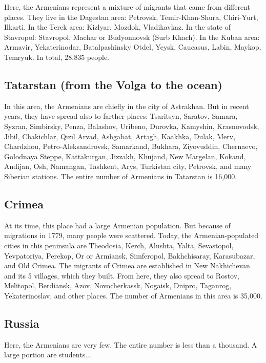 Here, the Armenians represent a mixture of migrants that came from different places. They live in the Dagestan area: Petrovsk, Temir-Khan-Shura, Chiri-Yurt, Ilkarti. In the Terek area: Kizlyar, Mozdok, Vladikavkaz. In the state of Stavropol: Stavropol, Machar or   Budyonnovsk (Surb
Khach). In the Kuban area: Armavir, Yekaterinodar, Batalpashinsky Otdel, Yeysk, Caucasus, Labin, Maykop, Temryuk. In total, 28,835 people. 

\subsection{Tatarstan (from the Volga to the ocean)}

In this area, the Armenians are chiefly in the city of Astrakhan. But in recent years, they have spread also to farther places: Tsaritsyn, Saratov, Samara, Syzran, Simbirsky, Penza, Balashov, Uribeno, Durovka, Kamyshin, Krasnovodsk, Jibil, Chakichlar, Qızıl Arvad, Ashgabat, Artəgh, Kaakhka, Dulak, Merv, Chardzhou, Petro-Aleksandrovsk, Samarkand, Bukhara, Ziyovuddin, Chernaevo, Golodnaya Steppe, Kattakurgan, Jizzakh, Khujand, New Margelan, Kokand, Andijan, Osh, Namangan, Tashkent, Arys, Turkistan city, Petrovsk, and many Siberian stations. The entire number of Armenians in Tatarstan is 16,000.

\subsection{Crimea}

At its time, this place had a large Armenian population. But because of migrations in 1779, many people were scattered. Today, the Armenian-populated cities in this peninsula are Theodosia, Kerch, Alushta, Yalta, Sevastopol, Yevpatoriya, Perekop, Or or Armiansk, Simferopol, Bakhchisaray, Karasubazar, and Old Crimea. The migrants of Crimea are established in New Nakhichevan and its 5 villages, which they built. From here, they also spread to Rostov, Melitopol, Berdiansk, Azov, Novocherkassk, Nogaisk, Dnipro, Taganrog, Yekaterinoslav, and other places. The number of Armenians in this area is 35,000. 

\subsection{Russia}

Here, the Armenians are very few. The entire number is less than a thousand. A large portion are students... 
\begin{adjarianpage}\label{page:27}\end{adjarianpage}%

